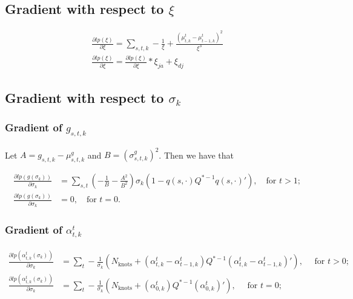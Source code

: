 \documentclass[12pt]{article}
\begin{document}
\subsection{Gradient with respect to $\xi$}

\begin{align*}
\frac{\partial lp (\xi)}{\partial \xi} = \sum_{s,t,k}  - \frac{1}{\xi} + \frac{(\mu_{t,k}^t - \mu_{t-1,k}^t)^2}{\xi^3} \\
\frac{\partial lp (\xi)}{\partial \xi} =\frac{\partial lp (\xi)}{\partial \xi} * \xi_{ja} + \xi_{dj}
\end{align*}

\subsection{Gradient with respect to $\sigma_k$}

\subsubsection{Gradient of $g_{s,t,k}$}

Let $A = g_{s,t,k} - \mu_{s,t,k}^g$ and $B=(\sigma_{s,t,k}^g)^2$. Then we have that

\begin{align*}
\frac{\partial lp (g (\sigma_k))}{\partial \sigma_k} &= \sum_{s,t} \left( - \frac{1}{B} - \frac{A^2}{B^2} \right) \sigma_k \left( 1 - q(s, \cdot) Q^{*-1} q(s, \cdot)' \right), \quad \text{for } t>1; \\
\frac{\partial lp (g (\sigma_k))}{\partial \sigma_k} &= 0, \quad \text{for } t=0.
\end{align*}

\subsubsection{Gradient of $\alpha_{t,k}^t$}

\begin{align*}
\frac{\partial lp (\alpha_{t,k}^t (\sigma_k))}{\partial \sigma_k} &= \sum_{t} - \frac{1}{\sigma_k} \left( N_{\text{knots}} + (\alpha_{t,k}^t - \alpha_{t-1,k}^t) Q^{*-1} (\alpha_{t,k}^t - \alpha_{t-1,k}^t)' \right), \quad \text{ for  } t>0; \\ 
\frac{\partial lp (\alpha_{t,k}^t (\sigma_k))}{\partial \sigma_k} &= \sum_{t} - \frac{1}{\sigma_k} \left( N_{\text{knots}} + (\alpha_{0,k}^t) Q^{*-1} (\alpha_{0,k}^t)' \right), \quad \text{ for  } t=0;
\end{align*}
\end{document}
